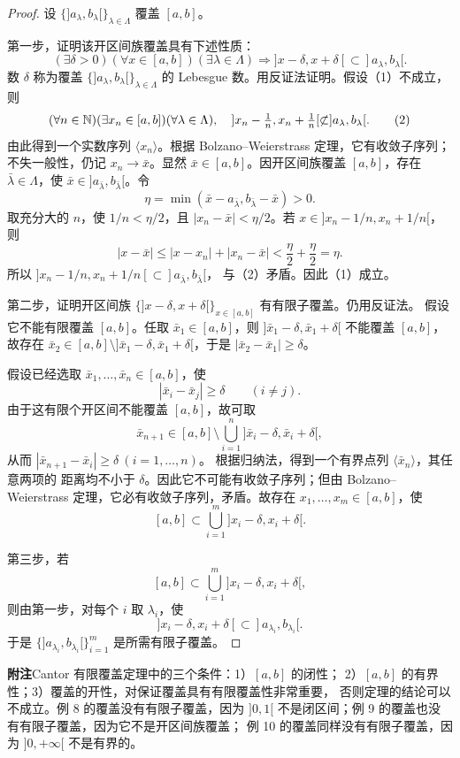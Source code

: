 \begin{proof}
设 \(\{]a_\lambda,b_\lambda[\}_{\lambda\in\Lambda}\) 覆盖 \([a,b]\)。

第一步，证明该开区间族覆盖具有下述性质：
\[
 (\exists\delta>0)(\forall x\in[a,b])(\exists\lambda\in\Lambda)
 \Longrightarrow ]x-\delta,x+\delta[
 \subset]a_\lambda,b_\lambda[. \tag{1}
\]
数 \(\delta\) 称为覆盖 \(\{]a_\lambda,b_\lambda[\}_{\lambda\in\Lambda}\)
的 Lebesgue 数。用反证法证明。假设（1）不成立，则
\[
(\forall n\in\mathbb{N})(\exists x_n\in[a,b])(\forall\lambda\in\Lambda),
\quad ]x_n-\tfrac1n,x_n+\tfrac1n[\not\subset]a_\lambda,b_\lambda[. \tag{2}
\]
由此得到一个实数序列 \(\langle x_n\rangle\)。根据 Bolzano--Weierstrass
定理，它有收敛子序列；不失一般性，仍记 \(x_n\to\bar x\)。显然
\(\bar x\in[a,b]\)。因开区间族覆盖 \([a,b]\)，存在
\(\bar\lambda\in\Lambda\)，使
\(\bar x\in]a_{\bar\lambda},b_{\bar\lambda}[\)。令
\[
\eta=\min(\bar x-a_{\bar\lambda},b_{\bar\lambda}-\bar x)>0.
\]
取充分大的 \(n\)，使 \(1/n<\eta/2\)，且
\(|x_n-\bar x|<\eta/2\)。若
\(x\in]x_n-1/n,x_n+1/n[\)，则
\[
|x-\bar x|\leqslant|x-x_n|+|x_n-\bar x|
<\frac\eta2+\frac\eta2=\eta.
\]
所以
\(]x_n-1/n,x_n+1/n[\subset]a_{\bar\lambda},b_{\bar\lambda}[\)，
与（2）矛盾。因此（1）成立。

第二步，证明开区间族
\(\{]x-\delta,x+\delta[\}_{x\in[a,b]}\) 有有限子覆盖。仍用反证法。
假设它不能有限覆盖 \([a,b]\)。任取 \(\bar x_1\in[a,b]\)，则
\(]\bar x_1-\delta,\bar x_1+\delta[\) 不能覆盖 \([a,b]\)，故存在
\(\bar x_2\in[a,b]\setminus]\bar x_1-\delta,\bar x_1+\delta[\)，于是
\(|\bar x_2-\bar x_1|\geqslant\delta\)。

假设已经选取 \(\bar x_1,\ldots,\bar x_n\in[a,b]\)，使
\[
|\bar x_i-\bar x_j|\geqslant\delta\qquad(i\ne j).
\]
由于这有限个开区间不能覆盖 \([a,b]\)，故可取
\[
\bar x_{n+1}\in[a,b]\setminus
\bigcup_{i=1}^n]\bar x_i-\delta,\bar x_i+\delta[,
\]
从而 \(|\bar x_{n+1}-\bar x_i|\geqslant\delta\ (i=1,\ldots,n)\)。
根据归纳法，得到一个有界点列 \(\langle\bar x_n\rangle\)，其任意两项的
距离均不小于 \(\delta\)。因此它不可能有收敛子序列；但由
Bolzano--Weierstrass 定理，它必有收敛子序列，矛盾。故存在
\(x_1,\ldots,x_m\in[a,b]\)，使
\[
[a,b]\subset\bigcup_{i=1}^m]x_i-\delta,x_i+\delta[.
\]

第三步，若
\[
[a,b]\subset\bigcup_{i=1}^m]x_i-\delta,x_i+\delta[,
\]
则由第一步，对每个 \(i\) 取 \(\lambda_i\)，使
\[
]x_i-\delta,x_i+\delta[
\subset]a_{\lambda_i},b_{\lambda_i}[.
\]
于是 \(\{]a_{\lambda_i},b_{\lambda_i}[\}_{i=1}^m\) 是所需有限子覆盖。
\end{proof}

\textbf{附注}\quad Cantor 有限覆盖定理中的三个条件：1）\([a,b]\) 的闭性；
2）\([a,b]\) 的有界性；3）覆盖的开性，对保证覆盖具有有限覆盖性非常重要，
否则定理的结论可以不成立。例 8 的覆盖没有有限子覆盖，因为 \(]0,1[\)
不是闭区间；例 9 的覆盖也没有有限子覆盖，因为它不是开区间族覆盖；
例 10 的覆盖同样没有有限子覆盖，因为 \(]0,+\infty[\) 不是有界的。

